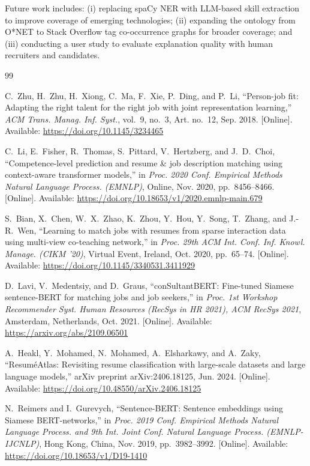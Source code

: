\documentclass[conference]{IEEEtran}
\begin{document}
Future work includes: (i) replacing spaCy NER with LLM-based skill
extraction to improve coverage of emerging technologies; (ii) expanding the
ontology from O*NET to Stack Overflow tag co-occurrence graphs for broader
coverage; and (iii) conducting a user study to evaluate explanation quality
with human recruiters and candidates.


\begin{thebibliography}{99}

C.~Zhu, H.~Zhu, H.~Xiong, C.~Ma, F.~Xie, P.~Ding, and P.~Li,
``Person-job fit: Adapting the right talent for the right job with joint
representation learning,''
\textit{ACM Trans. Manag. Inf. Syst.}, vol.~9, no.~3, Art. no.~12,
Sep. 2018.
[Online]. Available: \url{https://doi.org/10.1145/3234465}

C.~Li, E.~Fisher, R.~Thomas, S.~Pittard, V.~Hertzberg, and J.~D.~Choi,
``Competence-level prediction and resume \& job description matching using
context-aware transformer models,''
in \textit{Proc. 2020 Conf. Empirical Methods Natural Language Process.
(EMNLP)}, Online, Nov. 2020, pp.~8456--8466.
[Online]. Available: \url{https://doi.org/10.18653/v1/2020.emnlp-main.679}

S.~Bian, X.~Chen, W.~X.~Zhao, K.~Zhou, Y.~Hou, Y.~Song, T.~Zhang,
and J.-R.~Wen,
``Learning to match jobs with resumes from sparse interaction data using
multi-view co-teaching network,''
in \textit{Proc. 29th ACM Int. Conf. Inf. Knowl. Manage. (CIKM '20)},
Virtual Event, Ireland, Oct. 2020, pp.~65--74.
[Online]. Available: \url{https://doi.org/10.1145/3340531.3411929}

D.~Lavi, V.~Medentsiy, and D.~Graus,
``conSultantBERT: Fine-tuned Siamese sentence-BERT for matching jobs and
job seekers,''
in \textit{Proc. 1st Workshop Recommender Syst. Human Resources
(RecSys in HR 2021), ACM RecSys 2021}, Amsterdam, Netherlands, Oct. 2021.
[Online]. Available: \url{https://arxiv.org/abs/2109.06501}

A.~Heakl, Y.~Mohamed, N.~Mohamed, A.~Elsharkawy, and A.~Zaky,
``Resum\'eAtlas: Revisiting resume classification with large-scale datasets
and large language models,''
arXiv preprint arXiv:2406.18125, Jun. 2024.
[Online]. Available: \url{https://doi.org/10.48550/arXiv.2406.18125}

N.~Reimers and I.~Gurevych,
``Sentence-BERT: Sentence embeddings using Siamese BERT-networks,''
in \textit{Proc. 2019 Conf. Empirical Methods Natural Language Process.
and 9th Int. Joint Conf. Natural Language Process. (EMNLP-IJCNLP)},
Hong Kong, China, Nov. 2019, pp.~3982--3992.
[Online]. Available: \url{https://doi.org/10.18653/v1/D19-1410}


\end{thebibliography}
\end{document}
